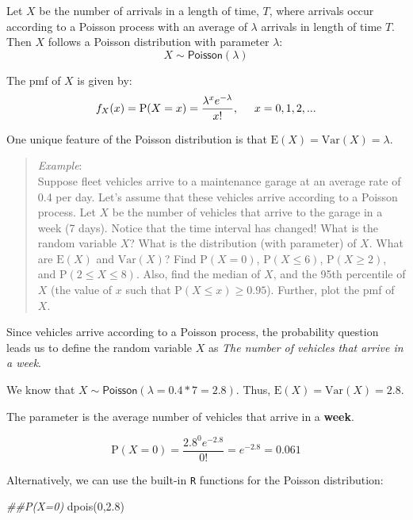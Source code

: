 \documentclass[
  letterpaper,
  DIV=11,
  numbers=noendperiod]{scrreprt}
\newenvironment{Shaded}{\begin{snugshade}}{\end{snugshade}}
\newcommand{\DecValTok}[1]{\textcolor[rgb]{0.68,0.00,0.00}{#1}}
\newcommand{\DocumentationTok}[1]{\textcolor[rgb]{0.37,0.37,0.37}{\textit{#1}}}
\newcommand{\FloatTok}[1]{\textcolor[rgb]{0.68,0.00,0.00}{#1}}
\newcommand{\FunctionTok}[1]{\textcolor[rgb]{0.28,0.35,0.67}{#1}}
\newcommand{\NormalTok}[1]{\textcolor[rgb]{0.00,0.23,0.31}{#1}}
\begin{document}
Let \(X\) be the number of arrivals in a length of time, \(T\), where
arrivals occur according to a Poisson process with an average of
\(\lambda\) arrivals in length of time \(T\). Then \(X\) follows a
Poisson distribution with parameter \(\lambda\): \[
X\sim \textsf{Poisson}(\lambda)
\]

The pmf of \(X\) is given by: \[
f_X(x)=\mbox{P}(X=x)=\frac{\lambda^xe^{-\lambda}}{x!}, \hspace{0.5cm} x=0,1,2,...
\]

One unique feature of the Poisson distribution is that
\(\mbox{E}(X)=\mbox{Var}(X)=\lambda\).

\begin{quote}
\emph{Example}:\\
Suppose fleet vehicles arrive to a maintenance garage at an average rate
of 0.4 per day. Let's assume that these vehicles arrive according to a
Poisson process. Let \(X\) be the number of vehicles that arrive to the
garage in a week (7 days). Notice that the time interval has changed!
What is the random variable \(X\)? What is the distribution (with
parameter) of \(X\). What are \(\mbox{E}(X)\) and \(\mbox{Var}(X)\)?
Find \(\mbox{P}(X=0)\), \(\mbox{P}(X\leq 6)\), \(\mbox{P}(X \geq 2)\),
and \(\mbox{P}(2 \leq X \leq 8)\). Also, find the median of \(X\), and
the 95th percentile of \(X\) (the value of \(x\) such that
\(\mbox{P}(X\leq x)\geq 0.95\)). Further, plot the pmf of \(X\).
\end{quote}

Since vehicles arrive according to a Poisson process, the probability
question leads us to define the random variable \(X\) as \emph{The
number of vehicles that arrive in a week}.

We know that \(X\sim \textsf{Poisson}(\lambda=0.4*7=2.8)\). Thus,
\(\mbox{E}(X)=\mbox{Var}(X)=2.8\).

The parameter is the average number of vehicles that arrive in a
\textbf{week}.

\[
\mbox{P}(X=0)=\frac{2.8^0 e^{-2.8}}{0!}=e^{-2.8}=0.061
\]

Alternatively, we can use the built-in \texttt{R} functions for the
Poisson distribution:

\begin{Shaded}
\begin{Highlighting}[]
\DocumentationTok{\#\#P(X=0)}
\FunctionTok{dpois}\NormalTok{(}\DecValTok{0}\NormalTok{,}\FloatTok{2.8}\NormalTok{)}
\end{Highlighting}
\end{Shaded}
\end{document}
